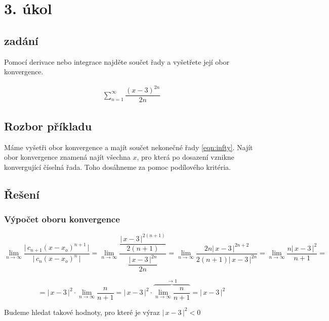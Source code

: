 \section{3. úkol}
\subsection*{zadání}
Pomocí derivace nebo integrace najděte součet řady a vyšetřete její obor konvergence.

\begin{eqnarray}
\sum\limits_{n=1}^\infty \dfrac{(x-3)^{2n}}{2n} \label{eqn:infty}
\end{eqnarray}


\subsection*{Rozbor příkladu}
Máme vyšetři obor konvergence a majít součet nekonečné řady \ref{eqn:infty}. Najít obor konvergence znamená najít všechna $x$, pro která po dosazení vznikne konvergující číselná řada. Toho dosáhneme za pomoc podílového kritéria.

\subsection*{Řešení}
\subsubsection{Výpočet oboru konvergence}

\begin{displaymath}
\lim_{n \rightarrow \infty} \dfrac{\big |\,c_{n+1}(x - x_o)^{n + 1}\,\big |}{\big | \,c_n(x - x_o)^{n} \, \big |} = 
\lim_{n \rightarrow \infty}  \dfrac{\dfrac{\big |\,x - 3\, \big|^{2(n+1)}}{2(n+1)}}{\dfrac{\big | \, x-3\, \big |^{2n}}{2n}} =
\lim_{n \rightarrow \infty} \dfrac{2n \big |\,x-3\,\big |^{2n+2}}{2(n+1)\big |\,x-3\,\big |^{2n}} = 
\lim_{n \rightarrow \infty}  \frac{n\big |\,x-3\,\big |^{2}}{n+1} = 
\end{displaymath}

\begin{displaymath}
= \big |\,x-3\,\big |^{2}\cdot\lim_{n \rightarrow \infty}  \frac{n}{n+1} =
\big |\,x-3\,\big |^{2}\cdot\overbrace{\lim_{n \rightarrow \infty}  \frac{n}{n+1}}^{\rightarrow 1} = \big |\,x-3\,\big |^{2}
\end{displaymath}
\vspace{18px}

\noindent Budeme hledat takové hodnoty, pro které je výraz $\big |\,x-3\,\big |^{2} < 0$

